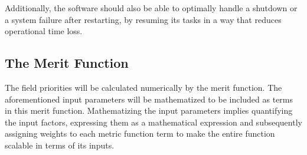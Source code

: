 \documentclass{article}
\begin{document}
Additionally, the software should also be able to optimally handle a shutdown or a system failure after restarting, by resuming its tasks in a way that reduces operational time loss.\par

\subsection{The Merit Function}
The field priorities will be calculated numerically by the merit function. The aforementioned input parameters will be mathematized to be included as terms in this merit function. Mathematizing the input parameters implies quantifying the input factors, expressing them as a mathematical expression and subsequently assigning weights to each metric function term to make the entire function scalable in terms of its inputs. 
\end{document}
